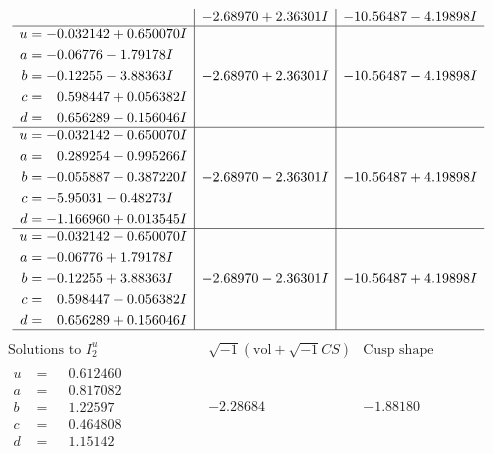 \documentclass[1p]{elsarticle_modified}
\theoremstyle{definition}
\newcommand{\I}{\sqrt{-1}}
\begin{document}
$$\begin{array}{c|c|c}
 & -2.68970 + 2.36301 I & -10.56487 - 4.19898 I \\ \hline\begin{aligned}
u &= -0.032142 + 0.650070 I \\
a &= -0.06776 - 1.79178 I \\
b &= -0.12255 - 3.88363 I \\
c &= \phantom{-}0.598447 + 0.056382 I \\
d &= \phantom{-}0.656289 - 0.156046 I\end{aligned}
 & -2.68970 + 2.36301 I & -10.56487 - 4.19898 I \\ \hline\begin{aligned}
u &= -0.032142 - 0.650070 I \\
a &= \phantom{-}0.289254 - 0.995266 I \\
b &= -0.055887 - 0.387220 I \\
c &= -5.95031 - 0.48273 I \\
d &= -1.166960 + 0.013545 I\end{aligned}
 & -2.68970 - 2.36301 I & -10.56487 + 4.19898 I \\ \hline\begin{aligned}
u &= -0.032142 - 0.650070 I \\
a &= -0.06776 + 1.79178 I \\
b &= -0.12255 + 3.88363 I \\
c &= \phantom{-}0.598447 - 0.056382 I \\
d &= \phantom{-}0.656289 + 0.156046 I\end{aligned}
 & -2.68970 - 2.36301 I & -10.56487 + 4.19898 I\\
 \hline 
 \end{array}$$\newpage$$\begin{array}{c|c|c}  
\text{Solutions to }I^u_{2}& \I (\text{vol} + \sqrt{-1}CS) & \text{Cusp shape}\\
 \hline 
\begin{aligned}
u &= \phantom{-}0.612460\phantom{ +0.000000I} \\
a &= \phantom{-}0.817082\phantom{ +0.000000I} \\
b &= \phantom{-}1.22597\phantom{ +0.000000I} \\
c &= \phantom{-}0.464808\phantom{ +0.000000I} \\
d &= \phantom{-}1.15142\phantom{ +0.000000I}\end{aligned}
 & -2.28684\phantom{ +0.000000I} & -1.88180\phantom{ +0.000000I} \\ \hline\begin{aligned}

\end{aligned}
\end{array}$$
\end{document}

